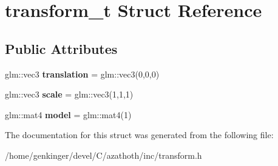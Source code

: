 \hypertarget{structtransform__t}{}\section{transform\+\_\+t Struct Reference}
\label{structtransform__t}
\subsection*{Public Attributes}
\begin{DoxyCompactItemize}
\item 
\mbox{\label{structtransform__t_a1c123363a668b3b10fbb9cd3531565b9}} 
glm\+::vec3 {\bfseries translation} = glm\+::vec3(0,0,0)
\item 
\mbox{\label{structtransform__t_a2450333fbbb3fb9723f5166b69e3e2f6}} 
glm\+::vec3 {\bfseries scale} = glm\+::vec3(1,1,1)
\item 
\mbox{\label{structtransform__t_a892e4adcc366184b8a530b2a39309629}} 
glm\+::mat4 {\bfseries model} = glm\+::mat4(1)
\end{DoxyCompactItemize}


The documentation for this struct was generated from the following file\+:\begin{DoxyCompactItemize}
\item 
/home/genkinger/devel/\+C/azathoth/inc/transform.\+h\end{DoxyCompactItemize}
